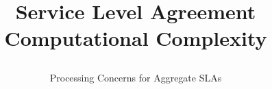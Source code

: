 \documentclass[a4paper,twoside]{article}
\begin{document}
\title{
Service Level Agreement Computational Complexity  
\subtitle{Processing Concerns for Aggregate SLAs}
}



\abstract{

}

\onecolumn \maketitle \normalsize \vfill





\end{document}
